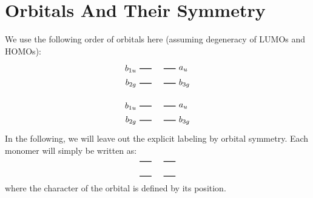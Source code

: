 \documentclass{article}
\begin{document}
    \pagestyle{empty}
    \tableofcontents 
    \newpage 
    \section{Orbitals And Their Symmetry}%

\vspace{2cm}
We use the following order of orbitals here (assuming degeneracy of LUMOs and HOMOs): 
$$
\begin{tikzpicture}[baseline={(current bounding box.center)}]
            \draw[thick] (0,0) -- (0.5,0)
                node[pos=0, left] {$b_{1u}$}
                ;
            \draw[thick] (1,0) -- (1.5,0)
                node[pos=1, right] {$a_{u}$}
                ;
            \draw[thick] (0,-0.6) -- (0.5,-0.6)
                node[pos=0, left] {$b_{2g}$}
                ;
            \draw[thick] (1,-0.6) -- (1.5,-0.6)
                node[pos=1, right] {$b_{3g}$}
                ;
        
\end{tikzpicture}
$$

    $$
\begin{tikzpicture}[baseline={(current bounding box.center)}]
 \draw[thick](0,-0.6)--(0.5,-0.6)node[pos=0,left]{$b_{2g}$};\draw[thick](1,-0.6)--(1.5,-0.6)node[pos=1,right]{$b_{3g}$};\draw[thick](0,0)--(0.5,0)node[pos=0,left]{$b_{1u}$};\draw[thick](1,0)--(1.5,0)node[pos=1,right]{$a_{u}$};
\end{tikzpicture}
$$
In the following, we will leave out the explicit labeling by orbital symmetry. Each monomer will simply be written as:
$$
\begin{tikzpicture}[baseline={(current bounding box.center)}]
            \draw[thick] (0,0) -- (0.5,0)
                ;
            \draw[thick] (1,0) -- (1.5,0)
                ;
            \draw[thick] (0,-0.6) -- (0.5,-0.6)
                ;
            \draw[thick] (1,-0.6) -- (1.5,-0.6)
                ;
        
\end{tikzpicture}
$$
where the character of the orbital is defined by its position. 
\end{document}
